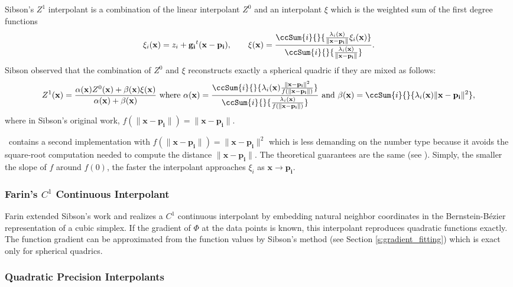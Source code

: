Sibson's $Z^1$ interpolant is a combination of the linear interpolant
$Z^0$ and an interpolant $\xi$ which is the weighted sum of the first
degree functions
$$\xi_i(\mathbf{x}) = z_i
+\mathbf{g_i}^t(\mathbf{x}-\mathbf{p_i}),\qquad \xi(\mathbf{x})= \frac{\ccSum{i}{}{ \frac{\lambda_i(\mathbf{x})}
  {\|\mathbf{x}-\mathbf{p_i}\|}\xi_i(\mathbf{x}) } }{\ccSum{i}{}{
  \frac{\lambda_i(\mathbf{x})}{\|\mathbf{x}-\mathbf{p_i}\|}}}.$$
Sibson observed that the combination of $Z^0$ and $\xi$ reconstructs exactly
a spherical quadric if they are mixed as follows:
$$
Z^1(\mathbf{x}) = \frac{\alpha(\mathbf{x}) Z^0(\mathbf{x}) +
  \beta(\mathbf{x}) \xi(\mathbf{x})}{\alpha(\mathbf{x}) +
  \beta(\mathbf{x})} \mbox{ where } \alpha(\mathbf{x}) =
\frac{\ccSum{i}{}{ \lambda_i(\mathbf{x}) \frac{\|\mathbf{x} -
    \mathbf{p_i}\|^2}{f(\|\mathbf{x} - \mathbf{p_i}\|)}}}{\ccSum{i}{}{
  \frac{\lambda_i(\mathbf{x})} {f(\|\mathbf{x} - \mathbf{p_i}\|)}}}
\mbox{ and } \beta(\mathbf{x})= \ccSum{i}{}{ \lambda_i(\mathbf{x})
\|\mathbf{x} - \mathbf{p_i}\|^2},$$
where in Sibson's original work,
$f(\|\mathbf{x} - \mathbf{p_i}\|) = \|\mathbf{x} - \mathbf{p_i}\|$.


\cgal\ contains a second implementation with $f(\|\mathbf{x} -
\mathbf{p_i}\|) = \|\mathbf{x} - \mathbf{p_i}\|^2$ which is less
demanding on the number type because it avoids the square-root
computation needed to compute the distance $\|\mathbf{x} -
\mathbf{p_i}\|$. The theoretical guarantees are the same (see
\cite{cgal:f-csapc-03}). Simply, the smaller the slope of $f$
around $f(0)$, the faster the interpolant approaches $\xi_i$ as
$\mathbf{x} \rightarrow \mathbf{p_i}$.

\subsubsection{Farin's $C^1$ Continuous Interpolant}

Farin \cite{f-sodt-90} extended Sibson's work and realizes a $C^1$
continuous interpolant by embedding natural neighbor coordinates in
the Bernstein-B\'ezier representation of a cubic simplex. If the
gradient of $\Phi$ at the data points is known, this interpolant
reproduces quadratic functions exactly. The function gradient can be
approximated from the function values by Sibson's method
\cite{s-bdnni-81} (see Section \ref{s:gradient_fitting}) which is exact only
for spherical quadrics.

\subsubsection{Quadratic Precision Interpolants}


